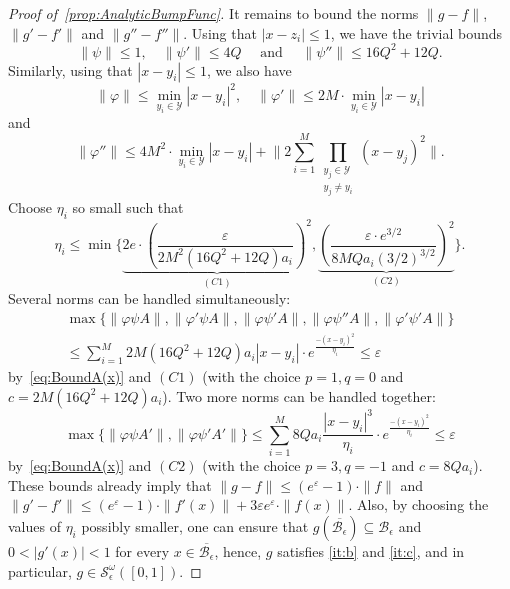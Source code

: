 \documentclass[11pt,a4paper]{article}
\def\cref#1{\ref{#1}}%
\theoremstyle{definition}
\theoremstyle{remark}
\newcommand{\0}{\mathbf{0}}
\numberwithin{equation}{section}
\begin{document}
\begin{proof}[Proof of~\cref{prop:AnalyticBumpFunc}]
It remains to bound the norms $\|g-f\|$, $\|g'-f'\|$ and $\|g''-f''\|$. Using that $|x-z_i|\leq 1$,
we have the trivial bounds
\begin{equation*}
\|\psi\| \leq 1, \quad \|\psi'\| \leq 4Q \quad\text{ and }\quad  \|\psi''\| \leq 16Q^2+12Q.
\end{equation*}
Similarly, using that $|x-y_i|\leq 1$, we also have
\begin{equation*}
\|\varphi\| \leq \min_{y_i\in\mathcal{Y}} |x-y_i|^2, \quad \|\varphi'\| \leq
2M\cdot\min_{y_i\in\mathcal{Y}} |x-y_i|  
\end{equation*} 
and
\begin{equation*}
\|\varphi''\| \leq 4M^2\cdot \min_{y_i\in\mathcal{Y}} |x-y_i| + \bigg\|2\sum_{i=1}^{M}
\prod_{\substack{y_j\in\mathcal{Y}\\ y_j\neq y_i}} (x-y_j)^2\bigg\|.
\end{equation*}
Choose $\eta_i$ so small such that
\begin{equation*}
\eta_i \leq \min \bigg\{ \underbrace{2e\cdot \left(\frac{\varepsilon}{2M^2(16Q^2+12Q)a_i}\right)^2
}_{(C1)}, \underbrace{ \left(\frac{\varepsilon\cdot
e^{3/2}}{8MQa_i(3/2)^{3/2}}\right)^2}_{(C2)}\bigg\}.
\end{equation*}
Several norms can be handled simultaneously:
\begin{multline*}
\max\{ \|\varphi \psi A\|,\|\varphi' \psi A\|, \|\varphi \psi' A\|, \|\varphi \psi'' A\|, \|\varphi'
\psi' A\| \} \\
\leq \sum_{i=1}^M 2M(16Q^2+12Q)a_i |x-y_i| \cdot e^{\frac{-(x-y_i)^2}{\eta_i}} \leq \varepsilon
\end{multline*}
by~\cref{eq:BoundA(x)} and $(C1)$ (with the choice $p=1, q=0$ and $c=2M(16Q^2+12Q)a_i$). Two more
norms can be handled together:
\begin{equation*}
\max\{ \|\varphi \psi A'\|, \|\varphi \psi' A'\| \}
	\leq \sum_{i=1}^M 8Qa_i \frac{|x-y_i|^3}{\eta_i} \cdot e^{\frac{-(x-y_i)^2}{\eta_i}} \leq \varepsilon
\end{equation*}
by~\cref{eq:BoundA(x)} and $(C2)$ (with the choice $p=3, q=-1$ and $c=8Qa_i$). These bounds already
imply that $\|g-f\|\leq (e^{\varepsilon}-1)\cdot \|f\|$ and $\|g'-f'\|\leq
(e^{\varepsilon}-1)\cdot\|f'(x)\|+3\varepsilon e^{\varepsilon} \cdot\|f(x)\|$. Also, by choosing the
values of $\eta_i$ possibly smaller, one can ensure that
$g(\overline{\mathcal{B}_\epsilon})\subseteq\mathcal{B}_\epsilon$ and $0<|g'(x)|<1$ for every
$x\in\overline{\mathcal{B}_\epsilon}$, hence, $g$ satisfies \cref{it:b} and \cref{it:c}, and in
particular, $g\in\mathcal{S}_\epsilon^\omega([0,1])$.


\end{proof}
\end{document}
